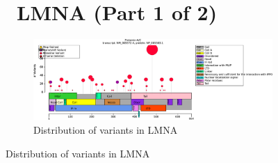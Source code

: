 \begin{figure}[htbp]
\section*{ LMNA (Part 1 of 2)}
\centering
\begin{subfigure}[b]{0.95\textwidth}
\centering
\includegraphics[width=\textwidth]{ img/LMNA_protein_diagram.pdf} 
\captionsetup{justification=raggedright,singlelinecheck=false}
\caption{Distribution of variants in LMNA}
\end{subfigure}

\vspace{2em}


\end{figure}

